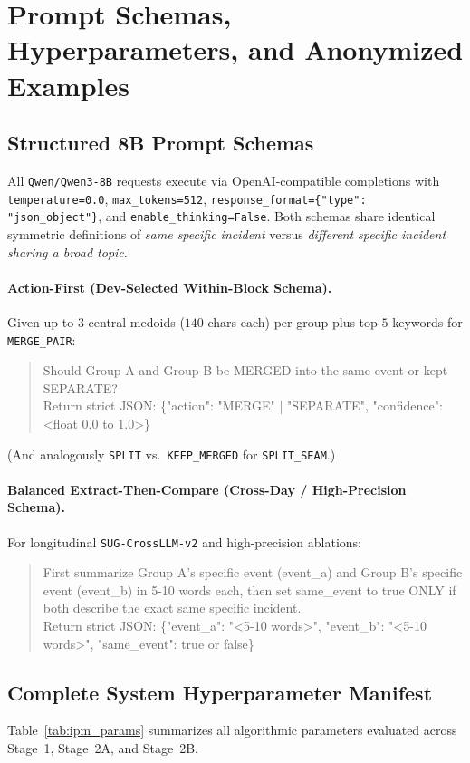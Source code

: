 \section{Prompt Schemas, Hyperparameters, and Anonymized Examples}
\label{app:prompts}

\subsection{Structured 8B Prompt Schemas}
All \texttt{Qwen/Qwen3-8B} requests execute via OpenAI-compatible completions with \texttt{temperature=0.0}, \texttt{max\_tokens=512}, \texttt{response\_format=\{"type": "json\_object"\}}, and \texttt{enable\_thinking=False}. Both schemas share identical symmetric definitions of \emph{same specific incident} versus \emph{different specific incident sharing a broad topic}.

\paragraph{Action-First (Dev-Selected Within-Block Schema).}
Given up to $3$ central medoids ($140$ chars each) per group plus top-$5$ keywords for \texttt{MERGE\_PAIR}:
\begin{quote}\small\ttfamily
Should Group A and Group B be MERGED into the same event or kept SEPARATE?\\
Return strict JSON: \{"action": "MERGE" | "SEPARATE", "confidence": <float 0.0 to 1.0>\}
\end{quote}
(And analogously \texttt{SPLIT} vs.\ \texttt{KEEP\_MERGED} for \texttt{SPLIT\_SEAM}.)

\paragraph{Balanced Extract-Then-Compare (Cross-Day / High-Precision Schema).}
For longitudinal \texttt{SUG-CrossLLM-v2} and high-precision ablations:
\begin{quote}\small\ttfamily
First summarize Group A's specific event (event\_a) and Group B's specific event (event\_b) in 5-10 words each, then set same\_event to true ONLY if both describe the exact same specific incident.\\
Return strict JSON: \{"event\_a": "<5-10 words>", "event\_b": "<5-10 words>", "same\_event": true or false\}
\end{quote}

\subsection{Complete System Hyperparameter Manifest}
Table~\ref{tab:ipm_params} summarizes all algorithmic parameters evaluated across Stage~1, Stage~2A, and Stage~2B.

